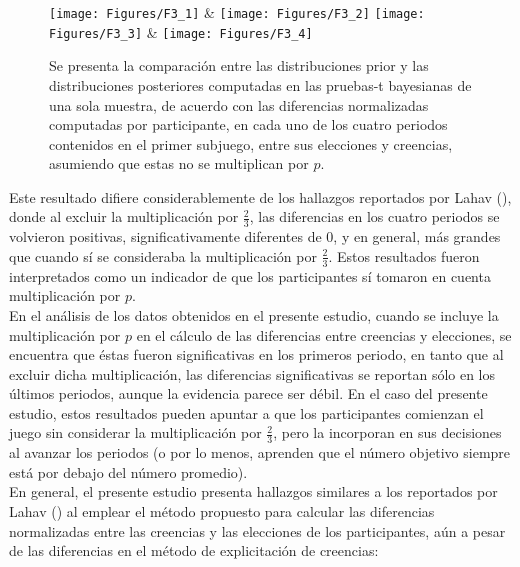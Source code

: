 \begin{figure}[hp]
\centering
\texttt{[image: Figures/F3\_1]} & \texttt{[image: Figures/F3\_2]} 
\texttt{[image: Figures/F3\_3]} & \texttt{[image: Figures/F3\_4]} 
\decoRule
\caption[Evaluación de las Diferencias Normalizadas entre creencias y elecciones en el Subjuegoo 1 (Factor de Bayes)]{Se presenta la comparación entre las distribuciones prior y las distribuciones posteriores computadas en las pruebas-t bayesianas de una sola muestra, de acuerdo con las diferencias normalizadas computadas por participante, en cada uno de los cuatro periodos contenidos en el primer subjuego, entre sus elecciones y creencias, asumiendo que estas no se multiplican por $p$.}
\label{fig:DNnop_S1}
\end{figure}

Este resultado difiere considerablemente de los hallazgos reportados por Lahav (\citeyear{Lahav}), donde al excluir la multiplicación por $\frac{2}{3}$, las diferencias en los cuatro periodos se volvieron positivas, significativamente diferentes de 0, y en general,  más grandes que cuando sí se consideraba la multiplicación por $\frac{2}{3}$. Estos resultados fueron interpretados como un indicador de que los participantes sí tomaron en cuenta multiplicación por $p$.\\

En el análisis de los datos obtenidos en el presente estudio, cuando se incluye la multiplicación por $p$ en el cálculo de las diferencias entre creencias y elecciones, se encuentra que éstas fueron significativas en los primeros periodo, en tanto que  al excluir dicha multiplicación, las diferencias significativas se reportan sólo en los últimos periodos, aunque la evidencia parece ser débil. En el caso del presente estudio, estos resultados pueden apuntar a que los participantes comienzan el juego sin considerar la multiplicación por $\frac{2}{3}$, pero la incorporan en sus decisiones al avanzar los periodos (o por lo menos, aprenden que el número objetivo siempre está por debajo del número promedio).\\

En general, el presente estudio presenta hallazgos similares a los reportados por Lahav (\citeyear{Lahav}) al emplear el método propuesto para calcular las diferencias normalizadas entre las creencias y las elecciones de los participantes, aún a pesar de las diferencias en el método de explicitación de creencias:\\

